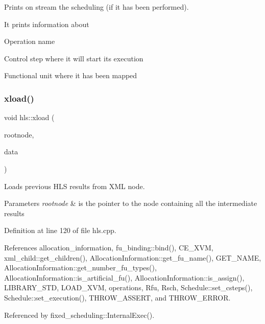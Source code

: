 Prints on stream the scheduling (if it has been performed). 

It prints information about
\begin{DoxyItemize}
\item Operation name
\item Control step where it will start its execution
\item Functional unit where it has been mapped 
\end{DoxyItemize}\mbox{\label{classhls_a49ad456bf4fd4865d39a688b90ffbff6}} 
\subsubsection{\texorpdfstring{xload()}{xload()}}
{\footnotesize\ttfamily void hls\+::xload (\begin{DoxyParamCaption}\item[{const \hyperlink{classxml__element}{xml\+\_\+element} $\ast$}]{rootnode,  }\item[{const \hyperlink{op__graph_8hpp_a9a0b240622c47584bee6951a6f5de746}{Op\+Graph\+Const\+Ref}}]{data }\end{DoxyParamCaption})}



Loads previous H\+LS results from X\+ML node. 


\begin{DoxyParams}{Parameters}
{\em rootnode} & is the pointer to the node containing all the intermediate results \\
\hline
\end{DoxyParams}


Definition at line 120 of file hls.\+cpp.



References allocation\+\_\+information, fu\+\_\+binding\+::bind(), C\+E\+\_\+\+X\+VM, xml\+\_\+child\+::get\+\_\+children(), Allocation\+Information\+::get\+\_\+fu\+\_\+name(), G\+E\+T\+\_\+\+N\+A\+ME, Allocation\+Information\+::get\+\_\+number\+\_\+fu\+\_\+types(), Allocation\+Information\+::is\+\_\+artificial\+\_\+fu(), Allocation\+Information\+::is\+\_\+assign(), L\+I\+B\+R\+A\+R\+Y\+\_\+\+S\+TD, L\+O\+A\+D\+\_\+\+X\+VM, operations, Rfu, Rsch, Schedule\+::set\+\_\+csteps(), Schedule\+::set\+\_\+execution(), T\+H\+R\+O\+W\+\_\+\+A\+S\+S\+E\+RT, and T\+H\+R\+O\+W\+\_\+\+E\+R\+R\+OR.



Referenced by fixed\+\_\+scheduling\+::\+Internal\+Exec().

